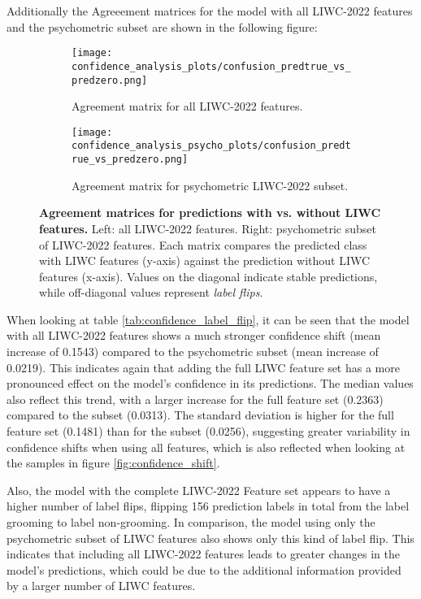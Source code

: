 Additionally the Agreeement matrices for the model with all LIWC-2022 features and the psychometric subset are shown in the following figure: 
\begin{figure}[H]
  \centering

  \begin{subfigure}[t]{0.49\textwidth}
    \centering
    \texttt{[image: confidence\_analysis\_plots/confusion\_predtrue\_vs\_predzero.png]}
    \caption{Agreement matrix for all LIWC-2022 features.}
    \label{fig:agreement_all}
  \end{subfigure}\hfill
  \begin{subfigure}[t]{0.49\textwidth}
    \centering
    \texttt{[image: confidence\_analysis\_psycho\_plots/confusion\_predtrue\_vs\_predzero.png]}
    \caption{Agreement matrix for psychometric LIWC-2022 subset.}
    \label{fig:agreement_psycho}
  \end{subfigure}

  \caption[Agreement matrices for predictions with vs. without LIWC features.]{\textbf{Agreement matrices for predictions with vs. without LIWC features.} 
  Left: all LIWC-2022 features. Right: psychometric subset of LIWC-2022 features. 
  Each matrix compares the predicted class with LIWC features (y-axis) against the prediction without LIWC features (x-axis). 
  Values on the diagonal indicate stable predictions, while off-diagonal values represent \emph{label flips}.}
  \label{fig:agreement_combined}
\end{figure}

When looking at table \ref{tab:confidence_label_flip}, it can be seen that the model with all LIWC-2022 features shows a much stronger confidence shift (mean increase of 0.1543) compared to the psychometric subset (mean increase of 0.0219). This indicates again that adding the full LIWC feature set has a more pronounced effect on the model's confidence in its predictions. The median values also reflect this trend, with a larger increase for the full feature set (0.2363) compared to the subset (0.0313). The standard deviation is higher for the full feature set (0.1481) than for the subset (0.0256), suggesting greater variability in confidence shifts when using all features, which is also reflected when looking at the samples in figure \ref{fig:confidence_shift}. 

Also, the model with the complete LIWC-2022 Feature set appears to have a higher number of label flips, flipping 156 prediction labels in total from the label grooming to label non-grooming. In comparison, the model using only the psychometric subset of LIWC features also shows only this kind of label flip. This indicates that including all LIWC-2022 features leads to greater changes in the model's predictions, which could be due to the additional information provided by a larger number of LIWC features.

